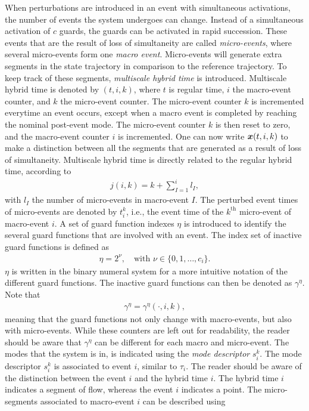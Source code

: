 \documentclass[../DC2017114Bouma.tex]{subfiles}
\begin{document}
When perturbations are introduced in an event with simultaneous activations, the number of events the system undergoes can change. Instead of a simultaneous activation of $c$ guards, the guards can be activated in rapid succession. These events that are the result of loss of simultaneity are called \textit{micro-events}, where several micro-events form one \textit{macro event}. Micro-events will generate extra segments in the state trajectory in comparison to the reference trajectory. To keep track of these segments, \textit{multiscale hybrid time} is introduced. Multiscale hybrid time is denoted by $(t,i,k)$, where $t$ is regular time, $i$ the macro-event counter, and $k$ the micro-event counter. The micro-event counter $k$ is incremented everytime an event occurs, except when a macro event is completed by reaching the nominal post-event mode. The micro-event counter $k$ is then reset to zero, and the macro-event counter $i$ is incremented. One can now write ${\boldsymbol{x}}(t,i,k)$ to make a distinction between all the segments that are generated as a result of loss of simultaneity. Multiscale hybrid time is directly related to the regular hybrid time, according to
\begin{align}
j(i,k) = k + \sum_{I=1}^{i}l_I,
\end{align}
with $l_I$ the number of micro-events in macro-event $I$. The perturbed event times of micro-events are denoted by $t^k_i$, i.e., the event time of the $k^{\text{th}}$ micro-event of macro-event $i$. A set of guard function indexes $\eta$ is introduced to identify the several guard functions that are involved with an event. The index set of inactive guard functions is defined as
\begin{align}
\eta = 2^{\nu},\quad\text{with }\nu\in\{0,1,\dots,c_i\}.
\end{align}
$\eta$ is written in the binary numeral system for a more intuitive notation of the different guard functions. The inactive guard functions can then be denoted as $\gamma^\eta$. Note that
\begin{align}
\gamma^\eta = \gamma^\eta(\cdot,i,k),
\end{align}
meaning that the guard functions not only change with macro-events, but also with micro-events. While these counters are left out for readability, the reader should be aware that $\gamma^\eta$ can be different for each macro and micro-event. The modes that the system is in, is indicated using the \textit{mode descriptor} $s^k_i$. The mode descriptor $s^k_i$ is associated to event $i$, similar to $\tau_i$. The reader should be aware of the distinction between the event $i$ and the hybrid time $i$. The hybrid time $i$ indicates a segment of flow, whereas the event $i$ indicates a point. The micro-segments associated to macro-event $i$ can be described using
\end{document}

